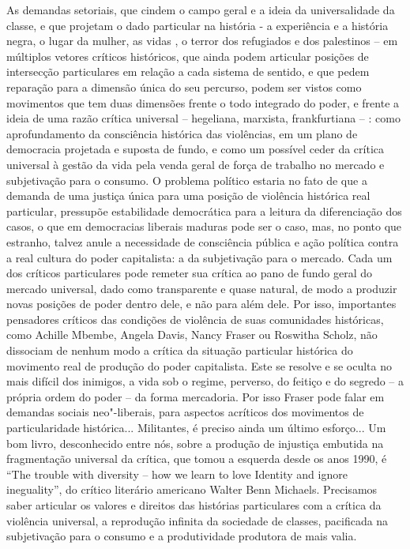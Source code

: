 As demandas setoriais, que cindem o campo geral e a ideia da
universalidade da classe, e que projetam o dado particular na história -
a experiência e a história negra, o lugar da mulher, as vidas , o
terror dos refugiados e dos palestinos -- em múltiplos vetores críticos
históricos, que ainda podem articular posições de intersecção
particulares em relação a cada sistema de sentido, e que pedem reparação
para a dimensão única do seu percurso, podem ser vistos como movimentos
que tem duas dimensões frente o todo integrado do poder, e frente a
ideia de uma razão crítica universal -- hegeliana, marxista,
frankfurtiana -- : como aprofundamento da consciência histórica das
violências, em um plano de democracia projetada e suposta de fundo, e
como um possível ceder da crítica universal à gestão da vida pela venda
geral de força de trabalho no mercado e subjetivação para o consumo. O
problema político estaria no fato de que a demanda de uma justiça única
para uma posição de violência histórica real particular, pressupõe
estabilidade democrática para a leitura da diferenciação dos casos, o
que em democracias liberais maduras pode ser o caso, mas, no ponto que
estranho, talvez anule a necessidade de consciência pública e ação
política contra a real cultura do poder capitalista: a da subjetivação
para o mercado. Cada um dos críticos particulares pode remeter sua
crítica ao pano de fundo geral do mercado universal, dado como
transparente e quase natural, de modo a produzir novas posições de poder
dentro dele, e não para além dele. Por isso, importantes pensadores
críticos das condições de violência de suas comunidades históricas, como
Achille Mbembe, Angela Davis, Nancy Fraser ou Roswitha Scholz, não
dissociam de nenhum modo a crítica da situação particular histórica do
movimento real de produção do poder capitalista. Este se resolve e se
oculta no mais difícil dos inimigos, a vida sob o regime, perverso, do
feitiço e do segredo -- a própria ordem do poder -- da forma mercadoria.
Por isso Fraser pode falar em demandas sociais neo"-liberais, para
aspectos acríticos dos movimentos de particularidade histórica...
Militantes, é preciso ainda um último esforço... Um bom livro,
desconhecido entre nós, sobre a produção de injustiça embutida na
fragmentação universal da crítica, que tomou a esquerda desde os anos
1990, é ``The trouble with diversity -- how we learn to love Identity and
ignore ineguality'', do crítico literário americano Walter Benn
Michaels. Precisamos saber articular os valores e direitos das histórias
particulares com a crítica da violência universal, a reprodução infinita
da sociedade de classes, pacificada na subjetivação para o consumo e a
produtividade produtora de mais valia.

